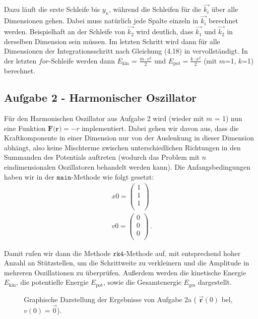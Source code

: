 Dazu läuft die erste Schleife bis $y_n$, während die Schleifen für die $\vec{k_i}$ über alle Dimensionen gehen. Dabei muss natürlich jede Spalte einzeln in $\vec{k_i}$ berechnet werden. Beispielhaft an der Schleife von $\vec{k_2}$ wird deutlich, dass $\vec{k_1}$ und $\vec{k_2}$ in derselben Dimension sein müssen.
Im letzten Schritt wird dann für alle Dimensionen der Integrationsschritt nach Gleichung (4.18) in \cite[52]{script} vervollständigt. In der letzten $\textit{for}$-Schleife werden dann $E_{\text{kin}}$ = $\frac{m\cdot v^2}{2}$ und $E_{\text{pot}} = \frac{k \cdot x^2}{2}$ (mit $m$=1, $k$=1) berechnet.
\subsection*{Aufgabe 2 - Harmonischer Oszillator}
Für den Harmonischen Oszillator aus Aufgabe 2 wird (wieder mit $m$ = 1) nun eine Funktion $\textbf{F(r)} = -r$ implementiert. Dabei gehen wir davon aus, dass die Kraftkomponente in einer Dimension nur von der Auslenkung in dieser Dimension abhängt, also keine Mischterme zwischen unterschiedlichen Richtungen in den Summanden des Potentials auftreten (wodurch das Problem mit $n$ eindimensionalen Oszillatoren behandelt werden kann). Die Anfangsbedingungen haben wir in der $\texttt{main}$-Methode wie folgt gesetzt:
\begin{equation*}
	\begin{split}
		&x0 =
		 \begin{pmatrix}
			1\\
			1\\
			1 \\
		\end{pmatrix} \\
		& v0 = 
		\begin{pmatrix}
		0 \\
		0 \\
		0 \\
		\end{pmatrix} \,.
	\end{split}
\end{equation*}

Damit rufen wir dann die Methode $\texttt{rk4}$-Methode auf, mit entsprechend hoher Anzahl an Stützstellen, um die Schrittweite zu verkleinern und die Amplitude in mehreren Oszillationen zu überprüfen. Außerdem werden die kinetische Energie $E_{\text{kin}}$, die potentielle Energie $E_{\text{pot}}$, sowie die Gesamtenergie $E_{\text{ges}}$ dargestellt.
\begin{landscape}
	\begin{figure}
		\caption{Graphische Darstellung der Ergebnisse von Aufgabe 2a ( $\vec{\textbf{r}}(0)$ bel, $v(0) = \vec{0}$).}
		\label{fig:a21}
	\end{figure}
\end{landscape}


